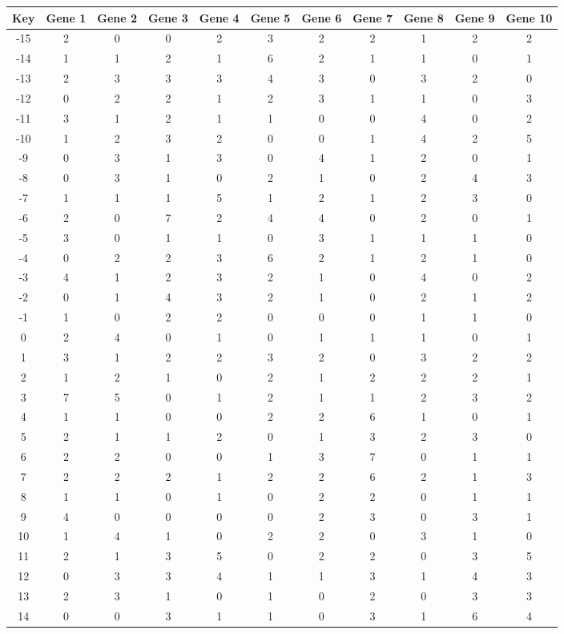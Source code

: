 \begin{tabular}{|c|c|c|c|c|c|c|c|c|c|c|}
\hline
Key & Gene 1 & Gene 2 & Gene 3 & Gene 4 & Gene 5 & Gene 6 & Gene 7 & Gene 8 & Gene 9 & Gene 10 \\
\hline
-15 & 2 & 0 & 0 & 2 & 3 & 2 & 2 & 1 & 2 & 2 \\
-14 & 1 & 1 & 2 & 1 & 6 & 2 & 1 & 1 & 0 & 1 \\
-13 & 2 & 3 & 3 & 3 & 4 & 3 & 0 & 3 & 2 & 0 \\
-12 & 0 & 2 & 2 & 1 & 2 & 3 & 1 & 1 & 0 & 3 \\
-11 & 3 & 1 & 2 & 1 & 1 & 0 & 0 & 4 & 0 & 2 \\
-10 & 1 & 2 & 3 & 2 & 0 & 0 & 1 & 4 & 2 & 5 \\
-9 & 0 & 3 & 1 & 3 & 0 & 4 & 1 & 2 & 0 & 1 \\
-8 & 0 & 3 & 1 & 0 & 2 & 1 & 0 & 2 & 4 & 3 \\
-7 & 1 & 1 & 1 & 5 & 1 & 2 & 1 & 2 & 3 & 0 \\
-6 & 2 & 0 & 7 & 2 & 4 & 4 & 0 & 2 & 0 & 1 \\
-5 & 3 & 0 & 1 & 1 & 0 & 3 & 1 & 1 & 1 & 0 \\
-4 & 0 & 2 & 2 & 3 & 6 & 2 & 1 & 2 & 1 & 0 \\
-3 & 4 & 1 & 2 & 3 & 2 & 1 & 0 & 4 & 0 & 2 \\
-2 & 0 & 1 & 4 & 3 & 2 & 1 & 0 & 2 & 1 & 2 \\
-1 & 1 & 0 & 2 & 2 & 0 & 0 & 0 & 1 & 1 & 0 \\
0 & 2 & 4 & 0 & 1 & 0 & 1 & 1 & 1 & 0 & 1 \\
1 & 3 & 1 & 2 & 2 & 3 & 2 & 0 & 3 & 2 & 2 \\
2 & 1 & 2 & 1 & 0 & 2 & 1 & 2 & 2 & 2 & 1 \\
3 & 7 & 5 & 0 & 1 & 2 & 1 & 1 & 2 & 3 & 2 \\
4 & 1 & 1 & 0 & 0 & 2 & 2 & 6 & 1 & 0 & 1 \\
5 & 2 & 1 & 1 & 2 & 0 & 1 & 3 & 2 & 3 & 0 \\
6 & 2 & 2 & 0 & 0 & 1 & 3 & 7 & 0 & 1 & 1 \\
7 & 2 & 2 & 2 & 1 & 2 & 2 & 6 & 2 & 1 & 3 \\
8 & 1 & 1 & 0 & 1 & 0 & 2 & 2 & 0 & 1 & 1 \\
9 & 4 & 0 & 0 & 0 & 0 & 2 & 3 & 0 & 3 & 1 \\
10 & 1 & 4 & 1 & 0 & 2 & 2 & 0 & 3 & 1 & 0 \\
11 & 2 & 1 & 3 & 5 & 0 & 2 & 2 & 0 & 3 & 5 \\
12 & 0 & 3 & 3 & 4 & 1 & 1 & 3 & 1 & 4 & 3 \\
13 & 2 & 3 & 1 & 0 & 1 & 0 & 2 & 0 & 3 & 3 \\
14 & 0 & 0 & 3 & 1 & 1 & 0 & 3 & 1 & 6 & 4 \\
\hline
\end{tabular}